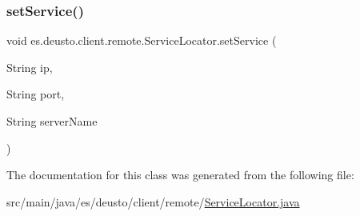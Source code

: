 \subsubsection{\texorpdfstring{setService()}{setService()}}
{\footnotesize\ttfamily void es.\+deusto.\+client.\+remote.\+Service\+Locator.\+set\+Service (\begin{DoxyParamCaption}\item[{String}]{ip,  }\item[{String}]{port,  }\item[{String}]{server\+Name }\end{DoxyParamCaption})}



The documentation for this class was generated from the following file\+:\begin{DoxyCompactItemize}
\item 
src/main/java/es/deusto/client/remote/\mbox{\hyperlink{_service_locator_8java}{Service\+Locator.\+java}}\end{DoxyCompactItemize}
